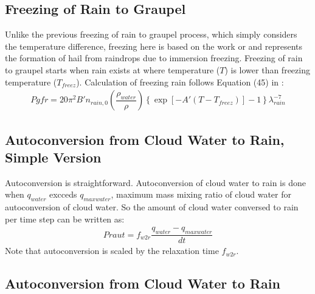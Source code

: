 \documentclass[letterpaper,titlepage,10pt]{article}
\numberwithin{equation}{section}
\begin{document}
\subsection{Freezing of Rain to Graupel}

Unlike the previous freezing of rain to graupel process, which simply considers the temperature difference, freezing here is based on the work or \citet{bigg1953thes} and represents the formation of hail from raindrops due to immersion freezing. Freezing of rain to graupel starts when rain exists at where temperature ($T$) is lower than freezing temperature ($T_{freez}$). Calculation of freezing rain follows Equation (45) in \citet{lin1983bulk}:
\begin{gather}
	Pgfr = 20 \pi^2 B' n_{rain,0} \left(\dfrac{\rho_{water}}{\rho} \right) \left\{\exp \left[- A' \left(T - T_{freez} \right) \right] - 1 \right\} \lambda^{-7}_{rain}
\end{gather}


\subsection{Autoconversion from Cloud Water to Rain, Simple Version}

Autoconversion is straightforward. Autoconversion of cloud water to rain is done when $q_{water}$ excceds $q_{maxwater}$, maximum mass mixing ratio of cloud water for autoconversion of cloud water. So the amount of cloud water conversed to rain per time step can be written as:
\begin{gather}
	Praut = f_{w2r} \dfrac{q_{water} - q_{maxwater}}{dt}
\end{gather}
Note that autoconversion is scaled by the relaxation time $f_{w2r}$.


\subsection{Autoconversion from Cloud Water to Rain}
\end{document}
